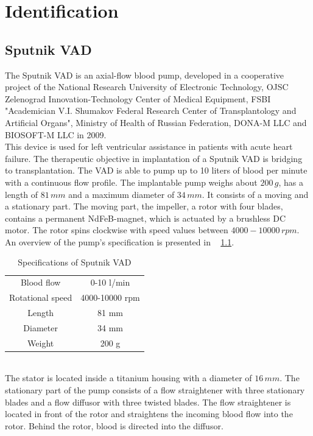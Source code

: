 \chapter{Identification}
\section{Sputnik VAD}\label{Sputnik}
The Sputnik VAD is an axial-flow blood pump, developed in a cooperative project of the National Research University of Electronic Technology, OJSC Zelenograd Innovation-Technology Center of Medical Equipment, FSBI "Academician V.I. Shumakov Federal Research Center of Transplantology and Artificial Organs", Ministry of Health of Russian Federation, DONA-M LLC and BIOSOFT-M LLC in 2009. \cite{Sputnik1}
\\This device is used for left ventricular assistance in patients with acute heart failure. The therapeutic objective in implantation of a Sputnik VAD is bridging to transplantation. The VAD is able to pump up to 10 liters of blood per minute with a continuous flow profile. The implantable pump weighs about $200\, g$, has a length of $81\, mm$ and a maximum diameter of $34\, mm$. It consists of a moving and a stationary part. The moving part, the impeller, a rotor with four blades, contains a permanent NdFeB-magnet, which is actuated by a brushless DC motor. The rotor spins clockwise with speed values between $4000-10000\, rpm$. An overview of the pump's specification is presented in \tablename~ \ref{tab:sput1}.
\begin{table}[ht]
  \centering
  \begin{tabular}{c|c}
    \toprule
    Blood flow  & 0-10 l/min \\
    Rotational speed & 4000-10000 rpm \\
    Length & 81 mm \\
    Diameter & 34 mm \\
    Weight & 200 g \\
    \bottomrule
\end{tabular}
  \caption[Specifications of Sputnik VAD]{Specifications of Sputnik VAD}
  \label{tab:sput1}
\end{table}
\\The stator is located inside a titanium housing with a diameter of $16\, mm$. The stationary part of the pump consists of a flow straightener with three stationary blades and a flow diffusor with three twisted blades. The flow straightener is located in front of the rotor and straightens the incoming blood flow into the rotor. Behind the rotor, blood is directed into the diffusor. %
